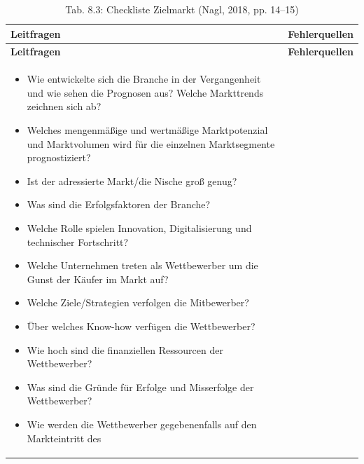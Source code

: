 \documentclass[
  letterpaper,
]{book}
\begin{document}
\begin{longtable}[]{@{}
  >{\raggedright\arraybackslash}p{}
  >{\raggedright\arraybackslash}p{}@{}}
\caption{Tab. 8.3: Checkliste Zielmarkt (Nagl, 2018, pp.
14--15)}\tabularnewline
\toprule\noalign{}
\begin{minipage}[b]{\linewidth}\raggedright
\textbf{Leitfragen}
\end{minipage} & \begin{minipage}[b]{\linewidth}\raggedright
\textbf{Fehlerquellen}
\end{minipage} \\
\midrule\noalign{}
\endfirsthead
\toprule\noalign{}
\begin{minipage}[b]{\linewidth}\raggedright
\textbf{Leitfragen}
\end{minipage} & \begin{minipage}[b]{\linewidth}\raggedright
\textbf{Fehlerquellen}
\end{minipage} \\
\midrule\noalign{}
\endhead
\bottomrule\noalign{}
\endlastfoot
\begin{minipage}[t]{\linewidth}\raggedright
\begin{itemize}
\item
  Wie entwickelte sich die Branche in der Vergangenheit und wie sehen
  die Prognosen aus? Welche Markttrends zeichnen sich ab?
\item
  Welches mengenmäßige und wertmäßige Marktpotenzial und Marktvolumen
  wird für die einzelnen Marktsegmente prognostiziert?
\item
  Ist der adressierte Markt/die Nische groß genug?
\item
  Was sind die Erfolgsfaktoren der Branche?
\item
  Welche Rolle spielen Innovation, Digitalisierung und technischer
  Fortschritt?
\item
  Welche Unternehmen treten als Wettbewerber um die Gunst der Käufer im
  Markt auf?
\item
  Welche Ziele/Strategien verfolgen die Mitbewerber?
\item
  Über welches Know-how verfügen die Wettbewerber?
\item
  Wie hoch sind die finanziellen Ressourcen der Wettbewerber?
\item
  Was sind die Gründe für Erfolge und Misserfolge der Wettbewerber?
\item
  Wie werden die Wettbewerber gegebenenfalls auf den Markteintritt des

\end{itemize}
\end{minipage}
\end{longtable}
\end{document}
